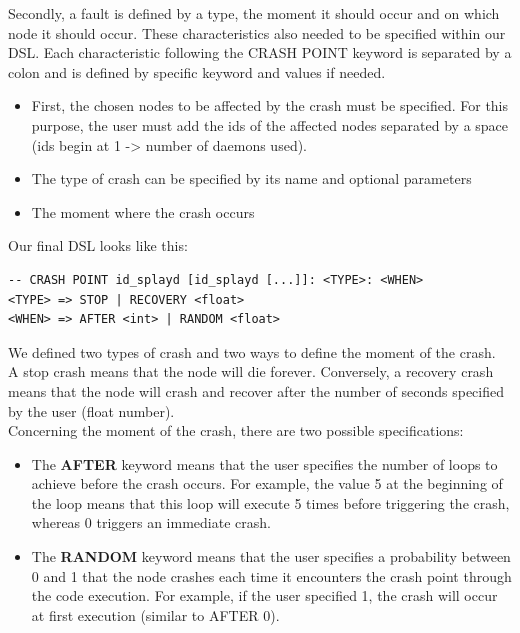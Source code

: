 \documentclass{eplmastersthesis}
\begin{document}
        Secondly, a fault is defined by a type, the moment it should occur and
        on which node it should occur. These characteristics also needed to
        be specified within our DSL. Each characteristic following the
        \textsc{CRASH POINT} keyword is separated by a colon and is defined
        by specific keyword and values if needed.

        \begin{itemize}
          \item First, the chosen nodes to be affected by the crash must be
          specified. For this purpose, the user must add the ids of the
          affected nodes separated by a space (ids begin at 1 -> number of
          daemons used).
          \item The type of crash can be specified by its name and optional
          parameters
          \item The moment where the crash occurs
        \end{itemize}

        Our final DSL looks like this:

        \begin{lstlisting}[style=MyBigBash]
-- CRASH POINT id_splayd [id_splayd [...]]: <TYPE>: <WHEN>
<TYPE> => STOP | RECOVERY <float>
<WHEN> => AFTER <int> | RANDOM <float>
        \end{lstlisting}

        We defined two types of crash and two ways to
        define the moment of the crash.\\
        A stop crash means that the node will die forever. Conversely, a
        recovery crash means that the node will crash and recover after the
        number of seconds specified by the user (float number).\\
        Concerning the moment of the crash, there are two possible specifications:

        \begin{itemize}
          \item The \textbf{\textsc{AFTER}} keyword means that the user specifies the
          number of loops to achieve before the crash occurs. For example,
          the value 5 at the beginning of the loop means that this loop will
          execute 5 times before triggering the crash, whereas 0 triggers
          an immediate crash.
          \item The \textbf{\textsc{RANDOM}} keyword means that the user specifies a
          probability between 0 and 1 that the node crashes each time it
          encounters the crash point through the code execution. For example,
          if the user specified 1, the crash will occur at first execution
          (similar to \textsc{AFTER} 0).
        \end{itemize}
\end{document}
